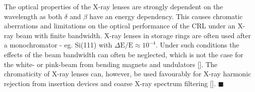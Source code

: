 \begin{refsection}
The optical properties of the X-ray lenses are strongly dependent on the wavelength as both $\delta$ and $\beta$ have an energy dependency. This causes chromatic aberrations and limitations on the optical performance of the CRL under an X-ray beam with finite bandwidth. X-ray lenses in storage rings are often used after a monochromator - eg. Si(111) with $\Delta \text{E}/\text{E}\approx10^{-4}$. Under such conditions the effects of the beam bandwidth can often be neglected, which is not the case for the white- or pink-beam from bending magnets and undulators [\cite{Seiboth2014}]. The chromaticity of X-ray lenses can, however, be used favourably for X-ray harmonic rejection from insertion devices and coarse X-ray spectrum filtering [\cite{Vaughan2011, Polikarpov2014}]. $\blacksquare$
\printbibliography[heading=subbibliography]
\end{refsection}


